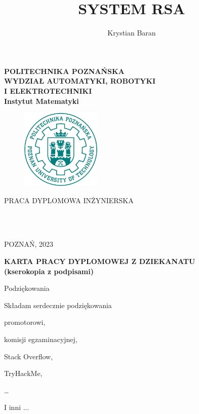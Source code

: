 \documentclass[12pt,twoside,a4]{mwbk}
\author{Krystian Baran}
\title{{\Large \bf SYSTEM RSA}}
\makeatletter
\theoremstyle{definition}
\renewcommand{\maketitle}{
\begin{titlepage}
  \begin{center}
    {\Large \bf POLITECHNIKA POZNAŃSKA}\\
    \vspace{0.15in}
    {\large \bf WYDZIAŁ AUTOMATYKI, ROBOTYKI \\I ELEKTROTECHNIKI}\\
    \vspace{0.15in}
    {\large \bf Instytut Matematyki}\\
    \vspace{0.3in}
    
    \begin{figure}[h]
    \centering
    \includegraphics[height=1.5in]{logoPP.jpg}
    \end{figure}

    \vspace{0.7in}
    {\large PRACA DYPLOMOWA INŻYNIERSKA}\\
    \vspace{0.15in}
    \textsc{\@title}
  \end{center}

 \begin{center}
   \vspace{0.8in}
   {\LARGE \centering \@author} \par
 \end{center}

 \begin{flushright}
    \vspace{1.2in}
     \hspace{4in}{Promotor:}\\
     \hspace{3 in}{dr Anna Iwaszkiewicz-Rudoszańska}\\
  \end{flushright}
    \vspace*{\stretch{1}}
    \begin{center}
    POZNAŃ, 2023 
    \end{center}
\end{titlepage}}
\makeatother
\begin{document}
\pagestyle{empty}
\maketitle

\newpage
\mbox{}

\newpage
\thispagestyle{empty}
    \vspace*{1cm}
   \begin{center} 
   {\Large \bf KARTA PRACY DYPLOMOWEJ Z DZIEKANATU\\
   (kserokopia z podpisami)}
   \end{center}

\newpage
\mbox{}

\newpage
{}

\hspace{7cm}
\begin{minipage}{7cm}
{\Large Podziękowania}
\vspace{5mm}


Składam serdecznie podziękowania

\quad promotorowi,

\qquad komisji egzaminacyjnej,

\hspace{3em} Stack Overflow,

\hspace{4em} TryHackMe,

\hspace{5em} \dots

\hspace{6em} I inni   ... 
\end{minipage}
\end{document}
